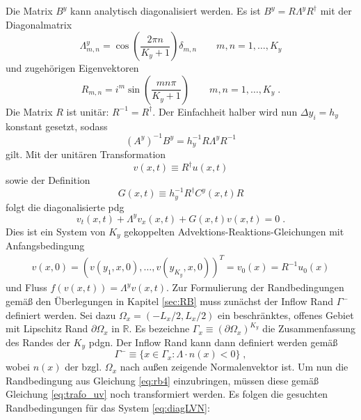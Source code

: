Die Matrix $B^y$ kann analytisch diagonalisiert werden. Es ist ${B^y = R\Lambda^y R^{\dagger}}$ mit der Diagonalmatrix
\begin{equation}
  \Lambda^y_{m,n} = \cos\left(\frac{2\pi n}{K_y+1}\right)\delta_{m,n}   \qquad m,n = 1,\dots,K_y
  \label{eq:Lambda}
\end{equation}
und zugehörigen Eigenvektoren
\begin{equation}
  R_{m,n} = i^m \sin\left(\frac{mn\pi}{K_y +1} \right)   \qquad m,n = 1,\dots,K_y \; .
\end{equation}
Die Matrix $R$ ist unitär: $R^{-1} = R^{\dagger}$. Der Einfachheit halber wird nun $\Delta y_i = h_y$ konstant gesetzt, sodass
\begin{equation}
  (A^y)^{-1}B^y = h_y^{-1}R\Lambda^y R^{-1}
\end{equation}
gilt. Mit der unitären Transformation
\begin{equation}
  v(x,t) \equiv R^{\dagger}u(x,t) \label{eq:trafo_uv}
\end{equation}
sowie der Definition
\begin{equation}
  G(x,t) \equiv h_y^{-1} R^{\dagger}C^y(x,t)R
  \label{eq:G}
\end{equation}
folgt die diagonalisierte \ac{pdg}
\begin{equation}
  v_t(x,t) + \Lambda^y v_x(x,t) + G(x,t)v(x,t) = 0 \; .
  \label{eq:diagLVN}
\end{equation}
Dies ist ein System von $K_y$ gekoppelten Advektions-Reaktions-Gleichungen mit Anfangsbedingung
\begin{align}
  v(x,0) = (v(y_1,x,0),\dots,v(y_{K_y},x,0))^T = {v}_0(x) = R^{-1}u_0(x)
\end{align}
und Fluss ${{f}({v}(x,t))=\Lambda^y {v}(x,t)}$. Zur Formulierung der Randbedingungen gemäß den Überlegungen in Kapitel \ref{sec:RB} muss zunächst der Inflow Rand $\Gamma^-$ definiert werden.
Sei dazu ${\Omega_x = (-L_x/2,L_x/2)}$ ein beschränktes, offenes Gebiet mit Lipschitz Rand $\partial\Omega_x$ in  $\mathbb{R}$. Es bezeichne $\Gamma_x\equiv (\partial\Omega_x)^{K_y}$ die Zusammenfassung des Randes der $K_y$ \ac{pdg}n. Der Inflow Rand kann dann definiert werden gemäß
\begin{equation}
  \Gamma^- \equiv \{x\in\Gamma_x : \Lambda \cdot n(x) < 0\} \; ,
\end{equation}
wobei $n(x)$ der bzgl. $\Omega_x$ nach außen zeigende Normalenvektor ist. Um nun die Randbedingung aus Gleichung \eqref{eq:rb4} einzubringen, müssen diese gemäß Gleichung \eqref{eq:trafo_uv} noch transformiert werden. Es folgen die gesuchten Randbedingungen für das System \eqref{eq:diagLVN}:
